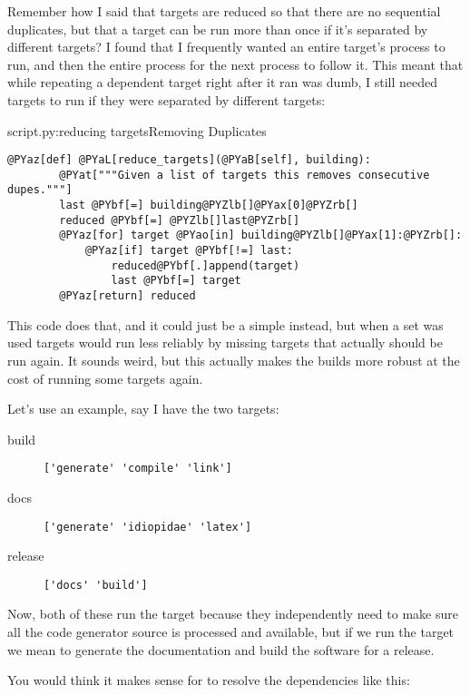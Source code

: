 Remember how I said that targets are reduced so that there are 
no sequential duplicates, but that a target can be run more than 
once if it's separated by different targets?  I found that I frequently wanted
an entire target's process to run, and then the entire process for the next
process to follow it.  This meant that while repeating a dependent target right after it
ran was dumb, I still needed targets to run if they were separated by different
targets:

\begin{code}{script.py:reducing targets}{Removing Duplicates}
\begin{Verbatim}[commandchars=@\[\]]
    @PYaz[def] @PYaL[reduce_targets](@PYaB[self], building):
        @PYat["""Given a list of targets this removes consecutive dupes."""]
        last @PYbf[=] building@PYZlb[]@PYax[0]@PYZrb[]
        reduced @PYbf[=] @PYZlb[]last@PYZrb[]
        @PYaz[for] target @PYao[in] building@PYZlb[]@PYax[1]:@PYZrb[]:
            @PYaz[if] target @PYbf[!=] last:
                reduced@PYbf[.]append(target)
                last @PYbf[=] target
        @PYaz[return] reduced
\end{Verbatim}

\end{code}

This code does that, and it could just be a simple  instead,
but when a set was used targets would run less reliably by missing
targets that actually should be run again.  It sounds weird, but this actually
makes the builds more robust at the cost of running some targets again.

Let's use an example, say I have the two targets:

\begin{description}
\item[build] \verb|['generate' 'compile' 'link']|
\item[docs] \verb|['generate' 'idiopidae' 'latex']|
\item[release] \verb|['docs' 'build']|
\end{description}

Now, both of these run the  target because they independently
need to make sure all the code generator source is processed and available,
but if we run the  target we mean to generate the documentation
and build the software for a release.

You would think it makes sense for  to resolve the dependencies 
like this: 

